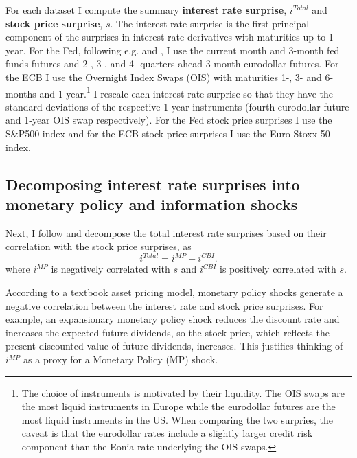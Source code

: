 \documentclass[a4paper,12pt]{article}
\begin{document}
For each dataset I compute the summary \textbf{interest rate surprise}, $i^{Total}$ and \textbf{stock price surprise}, $s$.
The interest rate surprise is the first principal component of the surprises in interest rate derivatives with maturities up to 1 year. 
For the Fed, following e.g. \cite{Gurkaynak_Sack_Swanson_2005a} and \cite{Nakamura_Steinsson_2018}, I use the current month and 3-month fed funds futures and 2-, 3-, and 4- quarters ahead 3-month eurodollar futures.
For the ECB I use the Overnight Index Swaps (OIS) with maturities 1-, 3- and 6-months and 1-year.\footnote{The choice of instruments is motivated by their liquidity. The OIS swaps are the most liquid instruments in Europe while the eurodollar futures are the most liquid instruments in the US. When comparing the two surpries, the caveat is that the eurodollar rates include a slightly larger credit risk component than the Eonia rate underlying the OIS swaps.}
I rescale each interest rate surprise so that they have the standard deviations of the respective 1-year instruments (fourth eurodollar future and 1-year OIS swap respectively).
For the Fed stock price surprises I use the S\&P500 index and for the ECB stock price surprises I use the Euro Stoxx 50 index.


\subsection{Decomposing interest rate surprises into monetary policy and information shocks}

Next, I follow  \cite{Jarocinski_Karadi_2020} and decompose the total interest rate surprises
based on their correlation with the stock price surprises, as
\begin{equation}
i^{Total} = i^{MP}+i^{CBI}.\label{eq: decomposition}
\end{equation}
where $i^{MP}$ is negatively correlated with $s$ and $i^{CBI}$ is positively correlated with $s$.

According to a textbook asset pricing model, monetary policy shocks generate a negative correlation between the interest rate and stock price surprises. For example, an expansionary monetary policy shock reduces the discount rate and increases the expected future dividends, so the stock price, which reflects the present discounted value of future dividends, increases. This justifies thinking of $i^{MP}$ as a proxy for a Monetary Policy (MP) shock.
\end{document}
